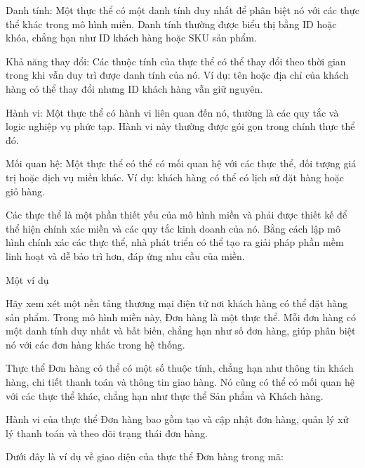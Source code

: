 Danh tính: Một thực thể có một danh tính duy nhất để phân biệt nó với các thực thể khác trong mô hình miền. Danh tính thường được biểu thị bằng ID hoặc khóa, chẳng hạn như ID khách hàng hoặc SKU sản phẩm.

Khả năng thay đổi: Các thuộc tính của thực thể có thể thay đổi theo thời gian trong khi vẫn duy trì được danh tính của nó. Ví dụ: tên hoặc địa chỉ của khách hàng có thể thay đổi nhưng ID khách hàng vẫn giữ nguyên.

Hành vi: Một thực thể có hành vi liên quan đến nó, thường là các quy tắc và logic nghiệp vụ phức tạp. Hành vi này thường được gói gọn trong chính thực thể đó.

Mối quan hệ: Một thực thể có thể có mối quan hệ với các thực thể, đối tượng giá trị hoặc dịch vụ miền khác. Ví dụ: khách hàng có thể có lịch sử đặt hàng hoặc giỏ hàng.

Các thực thể là một phần thiết yếu của mô hình miền và phải được thiết kế để thể hiện chính xác miền và các quy tắc kinh doanh của nó. Bằng cách lập mô hình chính xác các thực thể, nhà phát triển có thể tạo ra giải pháp phần mềm linh hoạt và dễ bảo trì hơn, đáp ứng nhu cầu của miền.

Một ví dụ

Hãy xem xét một nền tảng thương mại điện tử nơi khách hàng có thể đặt hàng sản phẩm. Trong mô hình miền này, Đơn hàng là một thực thể. Mỗi đơn hàng có một danh tính duy nhất và bất biến, chẳng hạn như số đơn hàng, giúp phân biệt nó với các đơn hàng khác trong hệ thống.

Thực thể Đơn hàng có thể có một số thuộc tính, chẳng hạn như thông tin khách hàng, chi tiết thanh toán và thông tin giao hàng. Nó cũng có thể có mối quan hệ với các thực thể khác, chẳng hạn như thực thể Sản phẩm và Khách hàng.

Hành vi của thực thể Đơn hàng bao gồm tạo và cập nhật đơn hàng, quản lý xử lý thanh toán và theo dõi trạng thái đơn hàng.

Dưới đây là ví dụ về giao diện của thực thể Đơn hàng trong mã:

